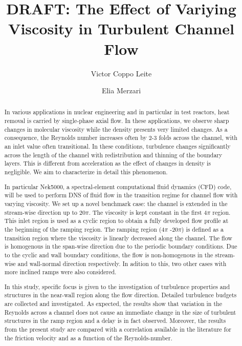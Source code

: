 \documentclass[twocolumn,10pt]{asme2e}
\title{DRAFT: The Effect of Variying Viscosity in Turbulent Channel Flow}
\author{Victor Coppo Leite
    \affiliation{
	Ken and Mary Alice Lindquist\\Department of Nuclear Engineering\\
	Pennsylvania State University\\
	University Park, PA 16802\\
    Email: vbc5085@psu.edu
    }	
}
\author{Elia Merzari
    \affiliation{
	Ken and Mary Alice Lindquist\\Department of Nuclear Engineering\\
	Pennsylvania State University\\
	University Park, PA 16802\\
    Email: ebm5153@psu.edu
    }	
}
\begin{document}
\maketitle    

\begin{abstract}
{In various applications in nuclear engineering and in particular in test reactors, heat removal is carried by single-phase axial flow. In these applications, we observe sharp changes in molecular viscosity while the density presents very limited changes. As a consequence, the Reynolds number increases often by 2-3 folds across the channel, with an inlet value often transitional.  In these conditions, turbulence changes significantly across the length of the channel with redistribution and thinning of the boundary layers. This is different from acceleration as the effect of changes in density is negligible. We aim to characterize in detail this phenomenon. 

In particular Nek5000, a spectral-element computational fluid dynamics (CFD) code, will be used to perform DNS of fluid flow in the transition regime for channel flow with varying viscosity.  We set up a novel benchmark case: the channel is extended in the stream-wise direction up to 20\(\pi\). The viscosity is kept constant in the first 4\(\pi\) region. This inlet region is used as a cyclic region to obtain a fully developed flow profile at the beginning of the ramping region. The ramping region (4\(\pi\) -20\(\pi\)) is defined as a transition region where the viscosity is linearly decreased along the channel. The flow is homogenous in the span-wise direction due to the periodic boundary conditions. Due to the cyclic and wall boundary conditions, the flow is non-homogenous in the stream-wise and wall-normal direction respectively. In adition to this, two other cases with more inclined ramps were also considered.

In this study, specific focus is given to the investigation of turbulence properties and structures in the near-wall region along the flow direction. Detailed turbulence budgets are collected and investigated. As expected, the results show that variation in the Reynolds across a channel does not cause an immediate change in the size of turbulent structures in the ramp region and a delay is in fact observed. Moreover, the results from the present study are compared with a correlation available in the literature for the friction velocity and as a function of the Reynolds-number.}
\end{abstract}
\end{document}
